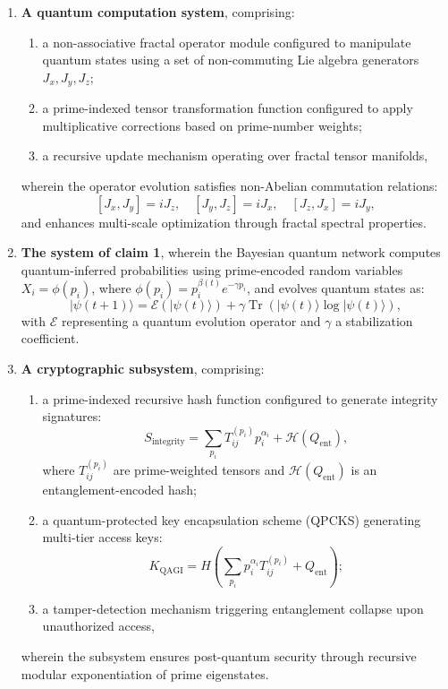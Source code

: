 \documentclass{article}
\theoremstyle{plain}
\theoremstyle{claimstyle}
\begin{document}
\begin{enumerate}
\item \textbf{A quantum computation system}, comprising:
\begin{enumerate}
    \item a non-associative fractal operator module configured to manipulate quantum states using a set of non-commuting Lie algebra generators \( J_x, J_y, J_z \);
    \item a prime-indexed tensor transformation function configured to apply multiplicative corrections based on prime-number weights;
    \item a recursive update mechanism operating over fractal tensor manifolds,
\end{enumerate}
wherein the operator evolution satisfies non-Abelian commutation relations:
\[
[J_x, J_y] = i J_z, \quad [J_y, J_z] = i J_x, \quad [J_z, J_x] = i J_y,
\]
and enhances multi-scale optimization through fractal spectral properties.

\item \textbf{The system of claim 1}, wherein the Bayesian quantum network computes quantum-inferred probabilities using prime-encoded random variables \( X_i = \phi(p_i) \), where \( \phi(p_i) = p_i^{\beta(t)} e^{-\gamma p_i} \), and evolves quantum states as:
\[
|\psi(t+1)\rangle = \mathcal{E}(|\psi(t)\rangle) + \gamma \operatorname{Tr}(|\psi(t)\rangle \log |\psi(t)\rangle),
\]
with \( \mathcal{E} \) representing a quantum evolution operator and \( \gamma \) a stabilization coefficient.

\item \textbf{A cryptographic subsystem}, comprising:
\begin{enumerate}
    \item a prime-indexed recursive hash function configured to generate integrity signatures:
    \[
    S_{\text{integrity}} = \sum_{p_i} T_{ij}^{(p_i)} p_i^{\alpha_i} + \mathcal{H}(Q_{\text{ent}}),
    \]
    where \( T_{ij}^{(p_i)} \) are prime-weighted tensors and \( \mathcal{H}(Q_{\text{ent}}) \) is an entanglement-encoded hash;
    \item a quantum-protected key encapsulation scheme (QPCKS) generating multi-tier access keys:
    \[
    K_{\text{QAGI}} = H\left(\sum_{p_i} p_i^{\alpha_i} T_{ij}^{(p_i)} + Q_{\text{ent}}\right);
    \]
    \item a tamper-detection mechanism triggering entanglement collapse upon unauthorized access,
\end{enumerate}
wherein the subsystem ensures post-quantum security through recursive modular exponentiation of prime eigenstates.


\end{enumerate}
\end{document}
